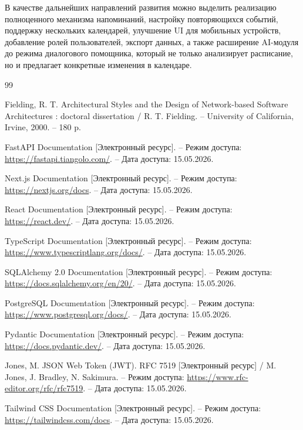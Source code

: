 \documentclass[14pt,a4paper]{extreport}
\begin{document}
В качестве дальнейших направлений развития можно выделить реализацию полноценного механизма напоминаний, настройку повторяющихся событий, поддержку нескольких календарей, улучшение UI для мобильных устройств, добавление ролей пользователей, экспорт данных, а также расширение AI-модуля до режима диалогового помощника, который не только анализирует расписание, но и предлагает конкретные изменения в календаре.

\begin{thebibliography}{99}

Fielding, R. T. Architectural Styles and the Design of Network-based Software Architectures : doctoral dissertation / R. T. Fielding. -- University of California, Irvine, 2000. -- 180 p.

FastAPI Documentation [Электронный ресурс]. -- Режим доступа: \url{https://fastapi.tiangolo.com/}. -- Дата доступа: 15.05.2026.

Next.js Documentation [Электронный ресурс]. -- Режим доступа: \url{https://nextjs.org/docs}. -- Дата доступа: 15.05.2026.

React Documentation [Электронный ресурс]. -- Режим доступа: \url{https://react.dev/}. -- Дата доступа: 15.05.2026.

TypeScript Documentation [Электронный ресурс]. -- Режим доступа: \url{https://www.typescriptlang.org/docs/}. -- Дата доступа: 15.05.2026.

SQLAlchemy 2.0 Documentation [Электронный ресурс]. -- Режим доступа: \url{https://docs.sqlalchemy.org/en/20/}. -- Дата доступа: 15.05.2026.

PostgreSQL Documentation [Электронный ресурс]. -- Режим доступа: \url{https://www.postgresql.org/docs/}. -- Дата доступа: 15.05.2026.

Pydantic Documentation [Электронный ресурс]. -- Режим доступа: \url{https://docs.pydantic.dev/}. -- Дата доступа: 15.05.2026.

Jones, M. JSON Web Token (JWT). RFC 7519 [Электронный ресурс] / M. Jones, J. Bradley, N. Sakimura. -- Режим доступа: \url{https://www.rfc-editor.org/rfc/rfc7519}. -- Дата доступа: 15.05.2026.

Tailwind CSS Documentation [Электронный ресурс]. -- Режим доступа: \url{https://tailwindcss.com/docs}. -- Дата доступа: 15.05.2026.


\end{thebibliography}
\end{document}
